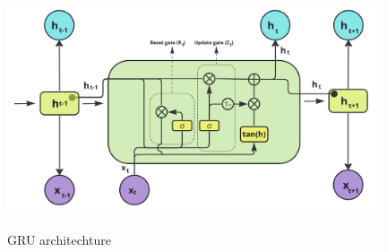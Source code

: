 \documentclass{ws-ijait}
\begin{document}
\begin{center}
	\begin{figure}[!htbp]
		\centering
		\includegraphics[width=11cm, height=7cm]{GRU.jpg}
		\caption{GRU architechture}
		\label{lstm}
	\end{figure}
\end{center}
\end{document}
